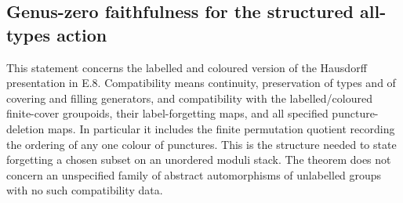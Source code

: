\subsection{Genus-zero faithfulness for the structured all-types action}

This statement concerns the labelled and coloured version of the
Hausdorff presentation in E.8. Compatibility means continuity, preservation
of types and of covering and filling generators, and compatibility with
the labelled/coloured finite-cover groupoids, their label-forgetting maps,
and all specified puncture-deletion maps. In particular it includes the
finite permutation quotient recording the ordering of any one colour of
punctures. This is the structure needed to state forgetting a chosen
subset on an unordered moduli stack. The theorem does not concern an
unspecified family of abstract automorphisms of unlabelled groups with no
such compatibility data.

